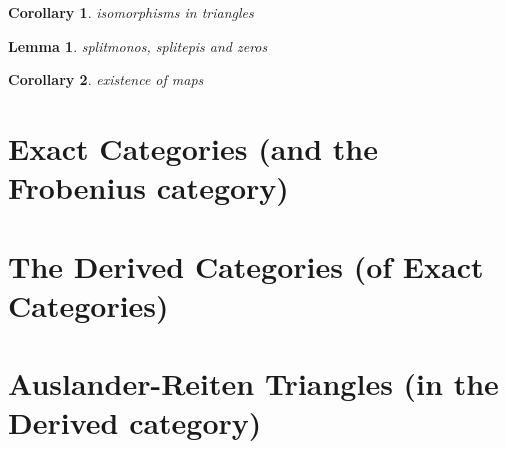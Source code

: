 \documentclass[12pt]{article}
\newtheorem{corollary}{Corollary}[theorem]
\newtheorem{lemma}[theorem]{Lemma}
\theoremstyle{definition}
\theoremstyle{remark}
\begin{document}
        \begin{corollary}
            isomorphisms in triangles
        \end{corollary}

        \begin{lemma}
            splitmonos, splitepis and zeros
        \end{lemma}

        \begin{corollary}
            existence of maps
        \end{corollary}
    \section{Exact Categories (and the Frobenius category)}
    \section{The Derived Categories (of Exact Categories)}
    \section{Auslander-Reiten Triangles (in the Derived category)}
\end{document}
